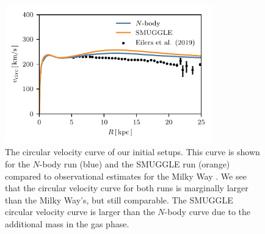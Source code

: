 \documentclass[twocolumn,linenumbers]{aastex631}
\newcommand{\Nbody}{$N$-body}
\newcommand{\SMUGGLE}{SMUGGLE}
\begin{document}
\begin{figure}
    \centering
    \includegraphics[width=9cm]{fig/vcirc.pdf}
    \caption{The circular velocity curve of our initial setups. This
    curve is shown for the \Nbody{} run (blue) and the \SMUGGLE{} run (orange)
    compared to observational estimates for the Milky
    Way \citep{2019ApJ...871..120E}. We see that the circular velocity curve for
    both runs is marginally larger than the Milky Way's, but still comparable. The
    \SMUGGLE{} circular velocity curve is larger than the \Nbody{} curve due to the
    additional mass in the gas phase.}
    \label{fig:vcirc}
\end{figure}



{}



\end{document}

